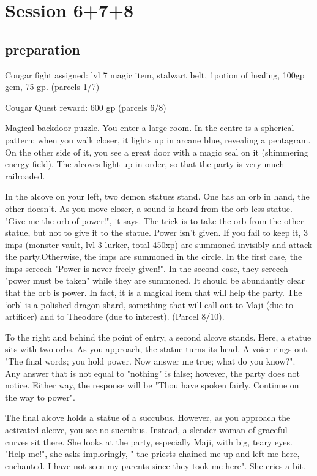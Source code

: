 \chapter{Session 6+7+8}
\section{preparation}
Cougar fight assigned: lvl 7 magic item, stalwart belt, 1potion of healing, 100gp gem, 75 gp. (parcels 1/7)

Cougar Quest reward: 600 gp (parcels 6/8)

Magical backdoor puzzle. You enter a large room. In the centre is a spherical pattern; when you walk closer, it lights up in arcane blue, revealing a pentagram. On the other side of it, you see a great door with a magic seal on it (shimmering energy field). The alcoves light up in order, so that the party is very much railroaded.

In the alcove on your left, two demon statues stand. One has an orb in hand, the other doesn't. As you move closer, a sound is heard from the orb-less statue. "Give me the orb of power!", it says. The trick is to take the orb from the other statue, but not to give it to the statue. Power isn't given. If you fail to keep it, 3 imps (monster vault, lvl 3 lurker, total 450xp) are summoned invisibly and attack the party.Otherwise, the imps are summoned in the circle. In the first case, the imps screech "Power is never freely given!". In the second case, they screech "power must be taken" while they are summoned. It should be abundantly clear that the orb is power. In fact, it is a magical item that will help the party. The `orb' is a polished dragon-shard, something that will call out to Maji (due to artificer) and to Theodore (due to interest). (Parcel 8/10).

To the right and behind the point of entry, a second alcove stands. Here, a statue sits with two orbs. As you approach, the statue turns its head. A voice rings out. "The final words; you hold power. Now answer me true; what do you know?". Any answer that is not equal to "nothing" is false; however, the party does not notice. Either way, the response will be "Thou have spoken fairly. Continue on the way to power".

The final alcove holds a statue of a succubus. However, as you approach the activated alcove, you see no succubus. Instead, a slender woman of graceful curves sit there. She looks at the party, especially Maji, with big, teary eyes. "Help me!", she asks imploringly, " the priests chained me up and left me here, enchanted. I have not seen my parents since they took me here". She cries a bit.

